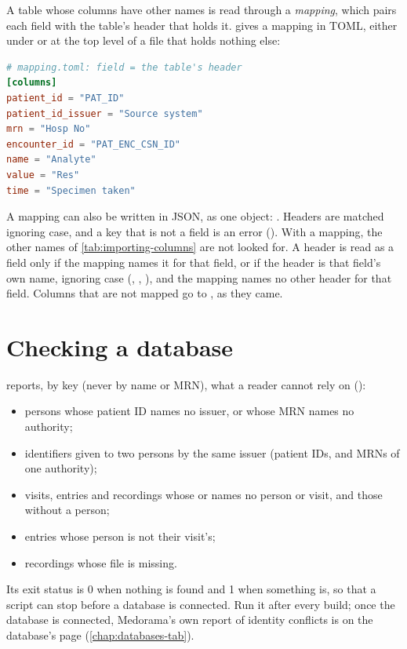 A table whose columns have other names is read through a \emph{mapping}, which pairs each field
with the table's header that holds it.  gives a mapping in TOML, either
under \code{[columns]} or at the top level of a file that holds nothing else:
\begin{lstlisting}[language=TOML]
# mapping.toml: field = the table's header
[columns]
patient_id = "PAT_ID"
patient_id_issuer = "Source system"
mrn = "Hosp No"
encounter_id = "PAT_ENC_CSN_ID"
name = "Analyte"
value = "Res"
time = "Specimen taken"
\end{lstlisting}
A mapping can also be written in JSON, as one object: . Headers are matched ignoring case, and a key that is not a field is an error
(). With a mapping, the other names of \cref{tab:importing-columns}
are not looked for. A header is read as a field only if the mapping names it for that field, or
if the header is that field's own name, ignoring case (, ,
), and the mapping names no other header for that field. Columns that are not
mapped go to , as they came.

\section{Checking a database}
\label{sec:importing-check}

 reports, by key (never by name or MRN), what a reader cannot rely on
():
\begin{itemize}
\item persons whose patient ID names no issuer, or whose MRN names no authority;
\item identifiers given to two persons by the same issuer (patient IDs, and MRNs of one
  authority);
\item visits, entries and recordings whose  or  names no person
  or visit, and those without a person;
\item entries whose person is not their visit's;
\item recordings whose file is missing.
\end{itemize}
Its exit status is 0 when nothing is found and 1 when something is, so that a script can stop
before a database is connected. Run it after every build; once the database is connected,
Medorama's own report of identity conflicts is on the database's page
(\cref{chap:databases-tab}).

